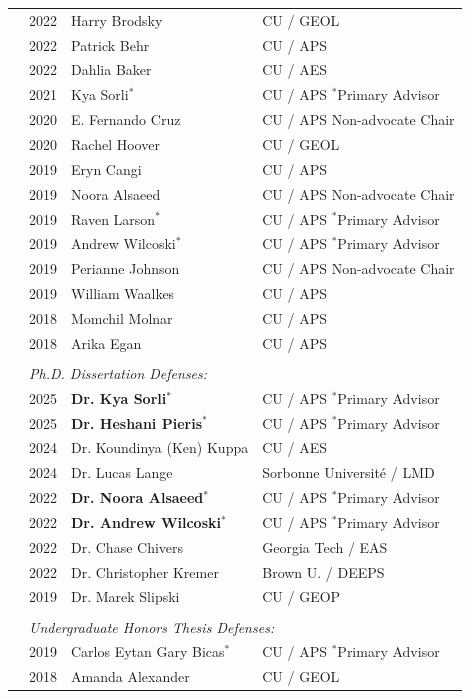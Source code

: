 \documentclass[letterpaper,10pt,twoside]{article}
\begin{document}
\begin{tabular}{@{} l l l l}
& 2022 & Harry Brodsky & CU / GEOL \\
& 2022 & Patrick Behr & CU / APS \\
& 2022 & Dahlia Baker & CU / AES \\
& 2021 & Kya Sorli$^*$ & CU / APS \hspace{1em} $^*$Primary Advisor \\
& 2020 & E. Fernando Cruz & CU / APS \hspace{1em} Non-advocate Chair \\
& 2020 & Rachel Hoover & CU / GEOL \\
& 2019 & Eryn Cangi & CU / APS \\
& 2019 & Noora Alsaeed & CU / APS \hspace{1em} Non-advocate Chair \\
& 2019 & Raven Larson$^*$ & CU / APS \hspace{1em} $^*$Primary Advisor \\
& 2019 & Andrew Wilcoski$^*$ & CU / APS \hspace{1em} $^*$Primary Advisor \\
& 2019 & Perianne Johnson & CU / APS \hspace{1em} Non-advocate Chair \\
& 2019 & William Waalkes & CU / APS \\
& 2018 & Momchil Molnar & CU / APS \\
& 2018 & Arika Egan & CU / APS \\
& \\
& \multicolumn{3}{l}{\textit{Ph.D. Dissertation Defenses:}} \\
& 2025 & \textbf{Dr. Kya Sorli}$^*$ & CU / APS \hspace{1in} $^*$Primary Advisor \\
& 2025 & \textbf{Dr. Heshani Pieris}$^*$ & CU / APS \hspace{1in} $^*$Primary Advisor \\
& 2024 & Dr. Koundinya (Ken) Kuppa & CU / AES \\
& 2024 & Dr. Lucas Lange & Sorbonne Université / LMD\\
& 2022 & \textbf{Dr. Noora Alsaeed}$^*$ & CU / APS \hspace{1in} $^*$Primary Advisor \\
& 2022 & \textbf{Dr. Andrew Wilcoski}$^*$ & CU / APS \hspace{1in} $^*$Primary Advisor \\
& 2022 & Dr. Chase Chivers & Georgia Tech / EAS \\
& 2022 & Dr. Christopher Kremer & Brown U. / DEEPS \\
& 2019 & Dr. Marek Slipski & CU / GEOP \\
& \\
& \multicolumn{3}{l}{\textit{Undergraduate Honors Thesis Defenses:}} \\
& 2019 & Carlos Eytan Gary Bicas$^*$ & CU / APS \hspace{1em} $^*$Primary Advisor \\
& 2018 & Amanda Alexander & CU / GEOL \\
\end{tabular}
\end{document}
